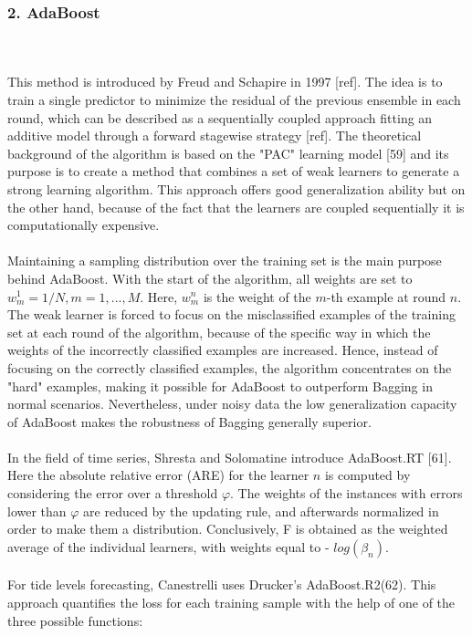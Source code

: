 \documentclass[runningheads,a4paper]{llncs}[2015/06/24]
\begin{document}
\subsubsection{2. AdaBoost}
\hspace{1cm}\\\\This method is introduced by Freud and Schapire in 1997 [ref]. The idea is to train a single predictor to minimize the residual of the previous ensemble in each round, which can be described as a sequentially coupled approach fitting an additive model through a forward stagewise strategy [ref]. The theoretical background of the algorithm is based on the "PAC" learning model [59] and its purpose is to create a method that combines a set of weak learners to generate a strong learning algorithm. This approach offers good generalization ability but on the other hand, because of the fact that the learners are coupled sequentially it is computationally expensive. \\\\Maintaining a sampling distribution over the training set is the main purpose behind AdaBoost. With the start of the algorithm, all weights are set to $w^1_m = 1/N, m = 1,..., M$. Here,  $w^n_m$ is the weight of the $m$-th example at round $n$.  The weak learner is forced to focus on the misclassified examples of the training set at each round of the algorithm, because of the specific way in which the weights of the incorrectly classified examples are increased. Hence, instead of focusing on the correctly classified examples, the algorithm concentrates on the "hard" examples, making it possible for AdaBoost to outperform Bagging in normal scenarios. Nevertheless, under noisy data the low generalization capacity of AdaBoost makes the robustness of Bagging generally superior. \\\\ In the field of time series, Shresta and Solomatine introduce AdaBoost.RT [61]. Here the absolute relative error (ARE) for the learner $n$ is computed by considering the error over a threshold $φ$. The weights of the instances with errors lower than $φ$ are reduced by the updating rule, and afterwards normalized in order to make them a distribution. Conclusively, F is obtained as the weighted average of the individual learners, with weights equal to - $log(β_n)$. \\\\For tide levels forecasting, Canestrelli uses Drucker's AdaBoost.R2(62).  This approach quantifies the loss for each training sample with the help of one of the three possible functions: 
\end{document}
